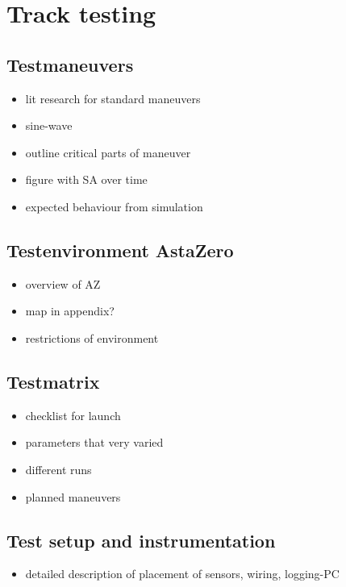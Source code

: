 \documentclass[ExampleMasters.tex]{subfiles}
\begin{document}
\section{Track testing}
\label{sec:track-testing}

\subsection{Testmaneuvers}

\begin{itemize}
	\item lit research for standard maneuvers
	\item sine-wave
	\item outline critical parts of maneuver
	\item figure with SA over time
	\item expected behaviour from simulation
\end{itemize}

\subsection{Testenvironment AstaZero}

\begin{itemize}
	\item overview of AZ
	\item map in appendix?
	\item restrictions of environment
	
\end{itemize}

\subsection{Testmatrix}

\begin{itemize}
	\item checklist for launch
	\item parameters that very varied
	\item different runs
	\item planned maneuvers
	
\end{itemize}

\subsection{Test setup and instrumentation}

\begin{itemize}
	\item detailed description of placement of sensors, wiring, logging-PC
\end{itemize}
\end{document}
